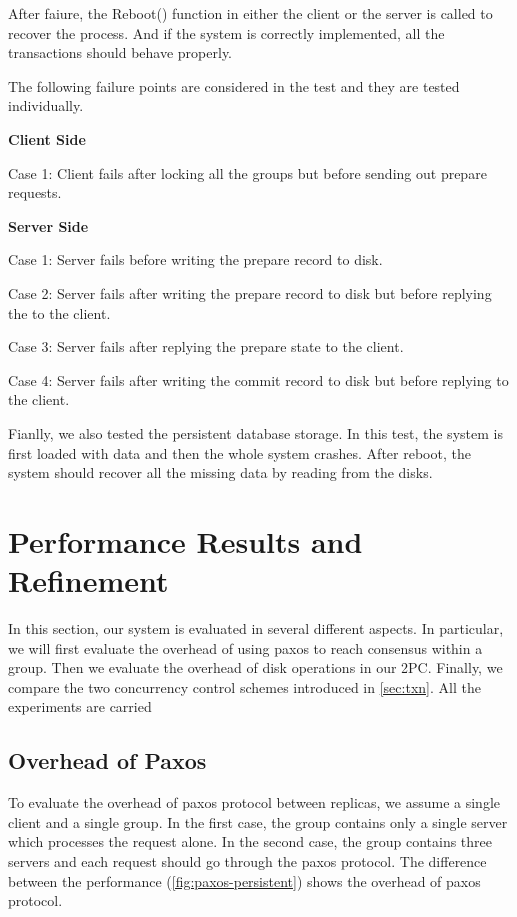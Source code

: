 \documentclass{vldb}
\begin{document}
After faiure, the Reboot() function in either the client or the server 
is called to recover the process. And if the system is correctly 
implemented, all the transactions should behave properly.

The following failure points are considered in the test and they are 
tested individually.

\textbf{Client Side}

Case 1: Client fails after locking all the groups but before sending 
out prepare requests.

\textbf{Server Side}

Case 1: Server fails before writing the prepare record to disk.

Case 2: Server fails after writing the prepare record to disk but 
before replying the to the client.

Case 3: Server fails after replying the prepare state to the client.

Case 4: Server fails after writing the commit record to disk but 
before replying to the client.

Fianlly, we also tested the persistent database storage. In this test, 
the system is first loaded with data and then the whole system 
crashes. After reboot, the system should recover all the missing data 
by reading from the disks. 

\section{Performance Results and Refinement}
\label{sec:eval}

In this section, our system is evaluated in several different aspects.  
In particular, we will first evaluate the overhead of using paxos to 
reach consensus within a group. Then we evaluate the overhead of disk 
operations in our 2PC. Finally, we compare the two concurrency control 
schemes introduced in \cref{sec:txn}. All the experiments are carried 

\subsection{Overhead of Paxos}

To evaluate the overhead of paxos protocol between replicas, we assume 
a single client and a single group.  In the first case, the group 
contains only a single server which processes the request alone.  In 
the second case, the group contains three servers and each request 
should go through the paxos protocol.  The difference between the 
performance (\cref{fig:paxos-persistent}) shows the overhead of paxos 
protocol. 
\end{document}
